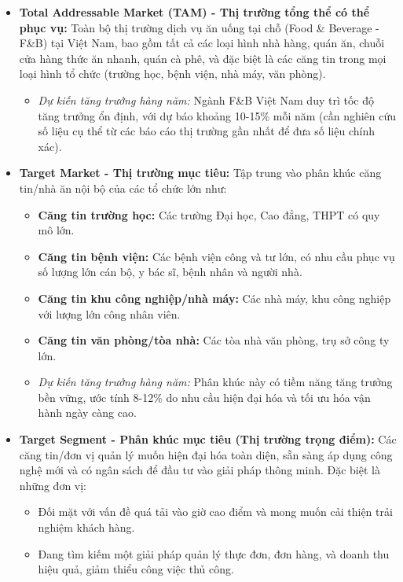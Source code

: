 \documentclass[12pt,a4paper]{article}
\begin{document}
\begin{itemize}[label=\textbullet]
    \item \textbf{Total Addressable Market (TAM) - Thị trường tổng thể có thể phục vụ:} Toàn bộ thị trường dịch vụ ăn uống tại chỗ (Food \& Beverage - F\&B) tại Việt Nam, bao gồm tất cả các loại hình nhà hàng, quán ăn, chuỗi cửa hàng thức ăn nhanh, quán cà phê, và đặc biệt là các căng tin trong mọi loại hình tổ chức (trường học, bệnh viện, nhà máy, văn phòng).
    \begin{itemize}[label=\textendash]
        \item \textit{Dự kiến tăng trưởng hàng năm:} Ngành F\&B Việt Nam duy trì tốc độ tăng trưởng ổn định, với dự báo khoảng 10-15\% mỗi năm (cần nghiên cứu số liệu cụ thể từ các báo cáo thị trường gần nhất để đưa số liệu chính xác).
    \end{itemize}
    \item \textbf{Target Market - Thị trường mục tiêu:} Tập trung vào phân khúc căng tin/nhà ăn nội bộ của các tổ chức lớn như:
    \begin{itemize}[label=\textendash]
        \item \textbf{Căng tin trường học:} Các trường Đại học, Cao đẳng, THPT có quy mô lớn.
        \item \textbf{Căng tin bệnh viện:} Các bệnh viện công và tư lớn, có nhu cầu phục vụ số lượng lớn cán bộ, y bác sĩ, bệnh nhân và người nhà.
        \item \textbf{Căng tin khu công nghiệp/nhà máy:} Các nhà máy, khu công nghiệp với lượng lớn công nhân viên.
        \item \textbf{Căng tin văn phòng/tòa nhà:} Các tòa nhà văn phòng, trụ sở công ty lớn.
        \item \textit{Dự kiến tăng trưởng hàng năm:} Phân khúc này có tiềm năng tăng trưởng bền vững, ước tính 8-12\% do nhu cầu hiện đại hóa và tối ưu hóa vận hành ngày càng cao.
    \end{itemize}
    \item \textbf{Target Segment - Phân khúc mục tiêu (Thị trường trọng điểm):} Các căng tin/đơn vị quản lý muốn hiện đại hóa toàn diện, sẵn sàng áp dụng công nghệ mới và có ngân sách để đầu tư vào giải pháp thông minh. Đặc biệt là những đơn vị:
    \begin{itemize}[label=\textendash]
        \item Đối mặt với vấn đề quá tải vào giờ cao điểm và mong muốn cải thiện trải nghiệm khách hàng.
        \item Đang tìm kiếm một giải pháp quản lý thực đơn, đơn hàng, và doanh thu hiệu quả, giảm thiểu công việc thủ công.

\end{itemize}
\end{itemize}
\end{document}
